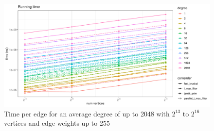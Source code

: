 \documentclass{article}
\begin{document}
\begin{figure}[htpb]
  \centering
  \includegraphics[width=\linewidth, page=5]{../plots/13_16_1_2048_255_1_2.pdf}
  \caption{Time per edge for an average degree of up to 2048 with $2^{13}$ to $2^{16}$ vertices and edge weights up to 255}%
  \label{fig:13_16_1_2048_255_1_2}
\end{figure}
\end{document}
